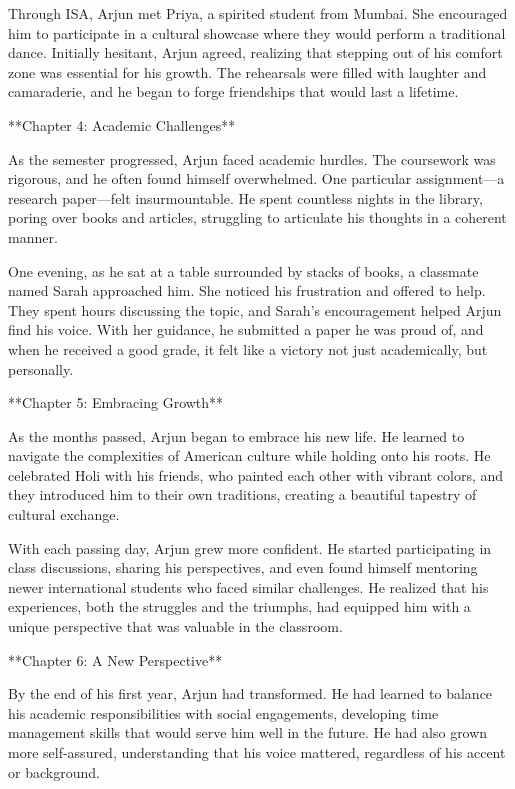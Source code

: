 \documentclass[11pt,addpoints,answers]{exam}
\begin{document}
\begin{questions}
\begin{tcolorbox}[fit,height=22cm, width=16cm, blank, borderline={1pt}{-2pt},nobeforeafter]
Through ISA, Arjun met Priya, a spirited student from Mumbai. She encouraged him to participate in a cultural showcase where they would perform a traditional dance. Initially hesitant, Arjun agreed, realizing that stepping out of his comfort zone was essential for his growth. The rehearsals were filled with laughter and camaraderie, and he began to forge friendships that would last a lifetime.

**Chapter 4: Academic Challenges**

As the semester progressed, Arjun faced academic hurdles. The coursework was rigorous, and he often found himself overwhelmed. One particular assignment—a research paper—felt insurmountable. He spent countless nights in the library, poring over books and articles, struggling to articulate his thoughts in a coherent manner.

One evening, as he sat at a table surrounded by stacks of books, a classmate named Sarah approached him. She noticed his frustration and offered to help. They spent hours discussing the topic, and Sarah's encouragement helped Arjun find his voice. With her guidance, he submitted a paper he was proud of, and when he received a good grade, it felt like a victory not just academically, but personally.

**Chapter 5: Embracing Growth**

As the months passed, Arjun began to embrace his new life. He learned to navigate the complexities of American culture while holding onto his roots. He celebrated Holi with his friends, who painted each other with vibrant colors, and they introduced him to their own traditions, creating a beautiful tapestry of cultural exchange.

With each passing day, Arjun grew more confident. He started participating in class discussions, sharing his perspectives, and even found himself mentoring newer international students who faced similar challenges. He realized that his experiences, both the struggles and the triumphs, had equipped him with a unique perspective that was valuable in the classroom.

**Chapter 6: A New Perspective**

By the end of his first year, Arjun had transformed. He had learned to balance his academic responsibilities with social engagements, developing time management skills that would serve him well in the future. He had also grown more self-assured, understanding that his voice mattered, regardless of his accent or background.


\end{tcolorbox}
\end{questions}
\end{document}
